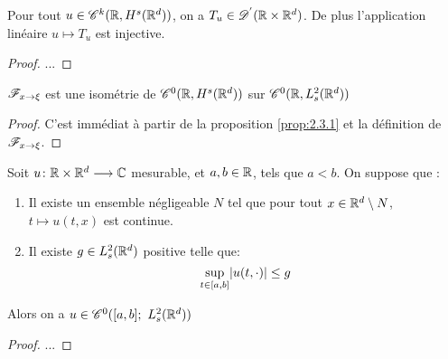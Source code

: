 \documentclass[french,a4paper,10pt]{article}
\begin{document}
            \begin{proposition}\label{prop:2.4.4}
                Pour tout $u \in \mathscr{C}^k(\mathbb{R},H^s(\mathbb{R}^d))$, on a $T_u \in \mathscr{D^{'}}(\mathbb{R} \times \mathbb{R}^d)$. De plus l'application linéaire $u \longmapsto T_u$ est injective.
            \end{proposition}

            \begin{proof}
                ...
            \end{proof}

            \begin{proposition}\label{prop:2.4.5}
                $\mathscr{F}_{x \to \xi}$ est une isométrie de $\mathscr{C}^0(\mathbb{R},H^s(\mathbb{R}^d))$ sur $\mathscr{C}^0(\mathbb{R},L^2_s(\mathbb{R}^d))$
            \end{proposition}

            \begin{proof}
                C'est immédiat à partir de la proposition \ref{prop:2.3.1} et la définition de $\mathscr{F}_{x \to \xi}$.
            \end{proof}

            \begin{proposition}\label{2.4.6}
                Soit $u\colon \mathbb{R} \times \mathbb{R}^d \longrightarrow \mathbb{C}$ mesurable, et $a,b \in \mathbb{R}$, tels que $a<b$. On suppose que :
                \begin{enumerate}
                    \item Il existe un ensemble négligeable $N$ tel que pour tout $x \in \mathbb{R}^d\setminus N$, $t \longmapsto u(t,x) $ est continue.

                    \item Il existe $g \in L^2_s(\mathbb{R}^d)$ positive telle que: 
                    \begin{equation*}
                        \sup\limits_{t\in \mathopen{}\left[a,b\right]\mathclose{}}\mathopen{}\left|u(t,\cdot)\right|\mathclose{} \leq g
                    \end{equation*}
                \end{enumerate}
                Alors on a $u\in \C^0(\ff{a,b}; \ L^2_s(\R^d))$
            \end{proposition}

            \begin{proof}
                ...
            \end{proof}
\end{document}
